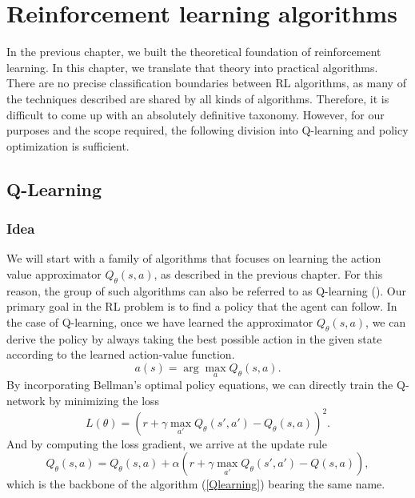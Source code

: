 \chapter{Reinforcement learning algorithms}\label{RLChapter}

In the previous chapter, we built the theoretical foundation of reinforcement learning.
In this chapter, we translate that theory into practical algorithms.
There are no precise classification boundaries between RL algorithms, as many of the techniques described are shared by all kinds of algorithms.
Therefore, it is difficult to come up with an absolutely definitive taxonomy.
However, for our purposes and the scope required, the following division into Q-learning and policy optimization is sufficient.

\section{Q-Learning}

\subsection*{Idea}
We will start with a family of algorithms that focuses on learning the action value approximator $Q_\theta(s,a)$, as described in the previous chapter.
For this reason, the group of such algorithms can also be referred to as Q-learning (\cite{Watkins:89}).
Our primary goal in the RL problem is to find a policy that the agent can follow.
In the case of Q-learning, once we have learned the approximator $Q_\theta(s,a)$, we can derive the policy by always taking the best possible action in the given state according to the learned action-value function.
\[a(s) = \arg \max_a Q_\theta(s,a).\]
By incorporating Bellman's optimal policy equations, we can directly train the Q-network by minimizing the loss
\[L(\theta)=(r + \gamma \max_{a'} Q_\theta(s',a') - Q_\theta(s,a))^2.\]
And by computing the loss gradient, we arrive at the update rule
\[Q_\theta(s,a) = Q_\theta(s,a) + \alpha (r + \gamma \max_{a'}Q_\theta(s',a') - Q(s,a)),\]
which is the backbone of the algorithm (\ref*{Qlearning}) bearing the same name.
